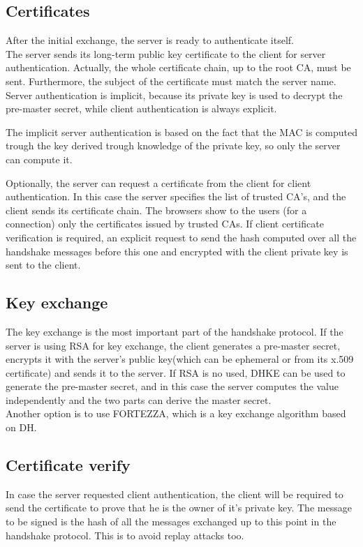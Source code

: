\subsection{Certificates}
After the initial exchange, the server is ready to authenticate
itself.\\
The server sends its long-term public key certificate to the client
for server authentication. Actually, the whole certificate chain, up
to the root CA, must be sent. Furthermore, the subject of the 
certificate must match the server name.\\
Server authentication is implicit, because its private key is used to
decrypt the pre-master secret, while client authentication is 
always explicit.

\begin{boxH}
  The implicit server authentication is based on the fact that the MAC
  is computed trough the key derived trough knowledge of the private
  key, so only the server can compute it.
\end{boxH}

Optionally, the server can request a certificate from the client for
client authentication. In this case the server specifies the list of
trusted CA's, and the client sends its certificate chain. The browsers
show to the users (for a connection) only the certificates issued by
trusted CAs.
If client certificate verification is required, an explicit request to
send the hash computed over all the handshake messages before this 
one and encrypted with the client private key is sent to the client.

\subsection{Key exchange}
The key exchange is the most important part of the handshake protocol.
If the server is using RSA for key exchange, the client generates a
pre-master secret, encrypts it with the server's public key(which can
be ephemeral or from its x.509 certificate) and sends it to the
server. If RSA is no used, DHKE can be used to generate the pre-master
secret, and in this case the server computes the value independently 
and the two parts can derive the master secret.\\
Another option is to use FORTEZZA, which is a key exchange algorithm
based on DH.

\subsection{Certificate verify}
In case the server requested client authentication, the client will be
required to send the certificate to prove that he is the owner of it's
private key. The message to be signed is the hash of all the messages
exchanged up to this point in the handshake protocol. This is to avoid
replay attacks too.


